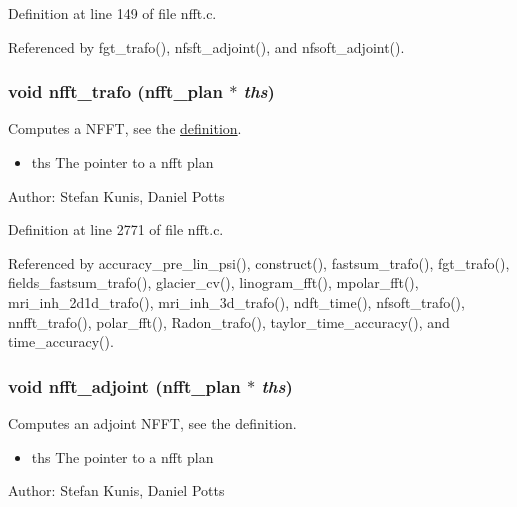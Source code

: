 Definition at line 149 of file nfft.c.

Referenced by fgt\_\-trafo(), nfsft\_\-adjoint(), and nfsoft\_\-adjoint().\hypertarget{group__nfft_g9f1e6bd9f7f956a8679e6b413c97b421}{
\subsubsection{\setlength{\rightskip}{0pt plus 5cm}void nfft\_\-trafo ({\bf nfft\_\-plan} $\ast$ {\em ths})}}
\label{group__nfft_g9f1e6bd9f7f956a8679e6b413c97b421}


Computes a NFFT, see the \hyperlink{group__nfft_ndft_formula}{definition}. 

\begin{itemize}
\item ths The pointer to a nfft plan\end{itemize}
\begin{Desc}
\item[Author:]Stefan Kunis, Daniel Potts \end{Desc}


Definition at line 2771 of file nfft.c.

Referenced by accuracy\_\-pre\_\-lin\_\-psi(), construct(), fastsum\_\-trafo(), fgt\_\-trafo(), fields\_\-fastsum\_\-trafo(), glacier\_\-cv(), linogram\_\-fft(), mpolar\_\-fft(), mri\_\-inh\_\-2d1d\_\-trafo(), mri\_\-inh\_\-3d\_\-trafo(), ndft\_\-time(), nfsoft\_\-trafo(), nnfft\_\-trafo(), polar\_\-fft(), Radon\_\-trafo(), taylor\_\-time\_\-accuracy(), and time\_\-accuracy().\hypertarget{group__nfft_g4b44c1dd52026dcb494dc735f0fa5b08}{
\subsubsection{\setlength{\rightskip}{0pt plus 5cm}void nfft\_\-adjoint ({\bf nfft\_\-plan} $\ast$ {\em ths})}}
\label{group__nfft_g4b44c1dd52026dcb494dc735f0fa5b08}


Computes an adjoint NFFT, see the definition. 

\begin{itemize}
\item ths The pointer to a nfft plan\end{itemize}
\begin{Desc}
\item[Author:]Stefan Kunis, Daniel Potts \end{Desc}


